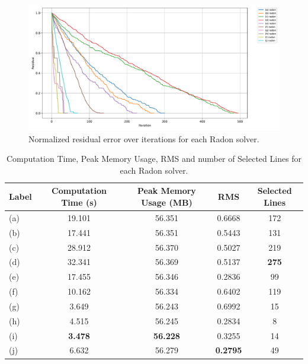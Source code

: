 \begin{figure}[H]
    \centering
    \includegraphics[width=\linewidth]{images/radon/normalized_residual_history.pdf}
    \caption{Normalized residual error over iterations for each Radon solver.}
    \label{fig:radon_norm_error}
\end{figure}

\begin{table}[!ht]
\centering
\caption{Computation Time, Peak Memory Usage, RMS and number of Selected Lines for each Radon solver.}
\begin{tabularx}{\textwidth}{l C C C C}
\toprule
\textbf{Label} & \textbf{Computation Time (s)} & \textbf{Peak Memory Usage (MB)} & \textbf{RMS} & \textbf{Selected Lines} \\
\midrule
(a) & 19.101            & 56.351            & 0.6668            & 172 \\
(b) & 17.441            & 56.351            & 0.5443            & 131 \\
(c) & 28.912            & 56.370            & 0.5027            & 219 \\
(d) & 32.341            & 56.369            & 0.5137            & \textbf{275} \\
(e) & 17.455            & 56.346            & 0.2836            &  99 \\
(f) & 10.162            & 56.334            & 0.6402            & 119 \\
(g) &  3.649            & 56.243            & 0.6992            &  15 \\
(h) &  4.515            & 56.245            & 0.2834            &   8 \\
(i) &  \textbf{3.478}   & \textbf{56.228}   & 0.3255            &  14 \\
(j) &  6.632            & 56.279            & \textbf{0.2795}   &  49 \\
\bottomrule
\end{tabularx}
\end{table}